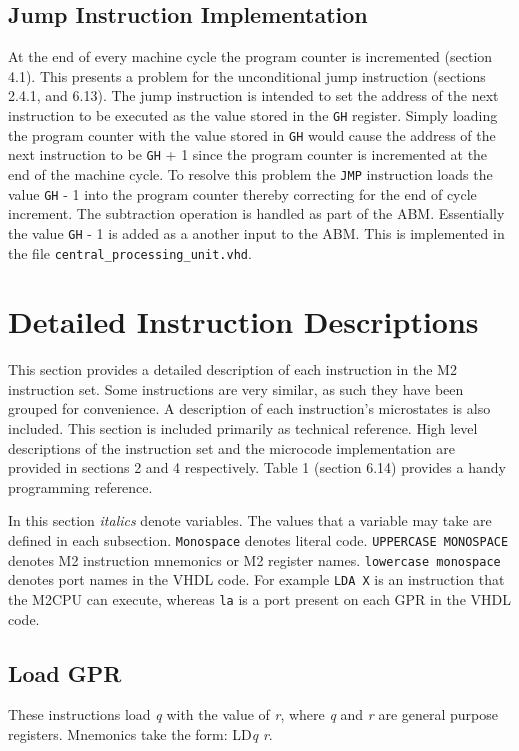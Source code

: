 \documentclass[a4paper,12pt]{article}
\newcommand{\mt}{M2CPU}
\newcommand{\mi}{M2 instruction set}
\newcommand{\Gr}{\texttt{G}}
\newcommand{\Hr}{\texttt{H}}
\newcommand{\qq}{\textit{q}}
\newcommand\rr{\textit{r}}
\begin{document}
\subsection{Jump Instruction Implementation}
At the end of every machine cycle the program counter is incremented (section 
4.1). This presents a problem for the unconditional jump instruction (sections 
2.4.1, and 6.13). The jump instruction is intended to set the address of the 
next instruction to be executed as the value stored in the \Gr{}\Hr{} register.
Simply loading the program counter with the value stored in \Gr{}\Hr{} would 
cause the address of the next instruction to be \Gr{}\Hr{} + 1 since the program
counter is incremented at the end of the machine cycle. To resolve this problem
the \texttt{JMP} instruction loads the value \Gr{}\Hr{} - 1 into the program
counter thereby correcting for the end of cycle increment. The subtraction 
operation is handled as part of the ABM. Essentially the value \Gr{}\Hr{} - 1
is added as a another input to the ABM. This is implemented in the file
\texttt{central\_processing\_unit.vhd}.
\par

\newpage
\section{Detailed Instruction Descriptions}
This section provides a detailed description of each instruction in the \mi{}.
Some instructions are very similar, as such they have been grouped for 
convenience. A description of each instruction's microstates is also included.
This section is included primarily as technical reference. High level 
descriptions of the instruction set and the microcode implementation are provided
in sections 2 and 4 respectively. Table 1 (section 6.14) provides a handy 
programming reference.
\par

In this section \textit{italics} denote variables. The values that a variable 
may take are defined in each subsection. \texttt{Monospace} denotes literal 
code. \texttt{UPPERCASE MONOSPACE} denotes M2 instruction mnemonics or M2 
register names. \texttt{lowercase monospace} denotes port names in the VHDL
code. For example \texttt{LDA X} is an instruction that the \mt{} can execute,
whereas \texttt{la} is a port present on each GPR in the VHDL code.
\par

\subsection{Load GPR}
These instructions load \qq{} with the value of \rr{}, where \qq{} and \rr{}
are general purpose registers. Mnemonics take the form: LD\qq{} \rr{}.
\par
\end{document}
